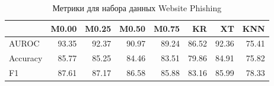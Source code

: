 \begin{table}
\caption{Метрики для набора данных Website Phishing}
\label{tab:Website Phishing}
\begin{tabular}{lrrrrrrr}
\toprule
 & M0.00 & M0.25 & M0.50 & M0.75 & KR & XT & KNN \\
\midrule
AUROC & 93.35 & 92.37 & 90.97 & 89.24 & 86.52 & 92.36 & 75.41 \\
Accuracy & 85.77 & 85.25 & 84.46 & 83.51 & 79.86 & 84.91 & 75.82 \\
F1 & 87.61 & 87.17 & 86.58 & 85.88 & 83.16 & 85.99 & 78.33 \\
\bottomrule
\end{tabular}
\end{table}
